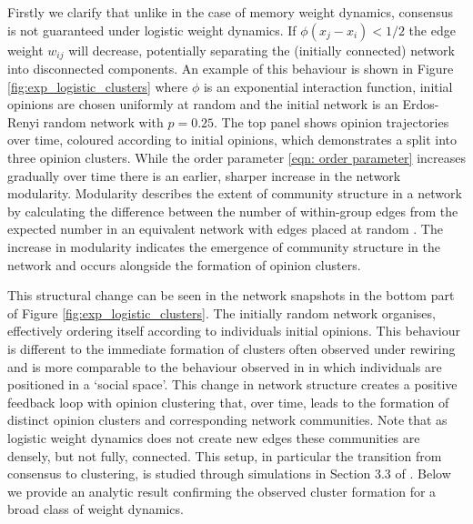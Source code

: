 \documentclass{article}
\begin{document}
Firstly we clarify that unlike in the case of memory weight dynamics, consensus is not guaranteed under logistic weight dynamics. If $\phi(x_j-x_i)<1/2$ the edge weight $w_{ij}$ will decrease, potentially separating the (initially connected) network into disconnected components. An example of this behaviour is shown in Figure \ref{fig:exp_logistic_clusters} where $\phi$ is an exponential interaction function, initial opinions are chosen uniformly at random and the initial network is an Erdos-Renyi random network with $p=0.25$. The top panel shows opinion trajectories over time, coloured according to initial opinions, which demonstrates a split into three opinion clusters. While the order parameter \eqref{eqn: order parameter} increases gradually over time there is an earlier, sharper increase in the network modularity. Modularity describes the extent of community structure in a network by calculating the difference between the number of within-group edges from the expected number in an equivalent network with edges placed at random \cite{newman2006modularity}. The increase in modularity indicates the emergence of community structure in the network and occurs alongside the formation of opinion clusters. 

This structural change can be seen in the network snapshots in the bottom part of Figure \ref{fig:exp_logistic_clusters}. The initially random network organises, effectively ordering itself according to individuals initial opinions. This behaviour is different to the immediate formation of clusters often observed under rewiring and is more comparable to the behaviour observed in \cite{djurdjevac2024co} in which individuals are positioned in a `social space'. This change in network structure creates a positive feedback loop with opinion clustering that, over time, leads to the formation of distinct opinion clusters and corresponding network communities. Note that as logistic weight dynamics does not create new edges these communities are densely, but not fully, connected. This setup, in particular the transition from consensus to clustering, is studied through simulations in Section 3.3 of \cite{nugent2023evolving}. Below we provide an analytic result confirming the observed cluster formation for a broad class of weight dynamics. 
\end{document}

